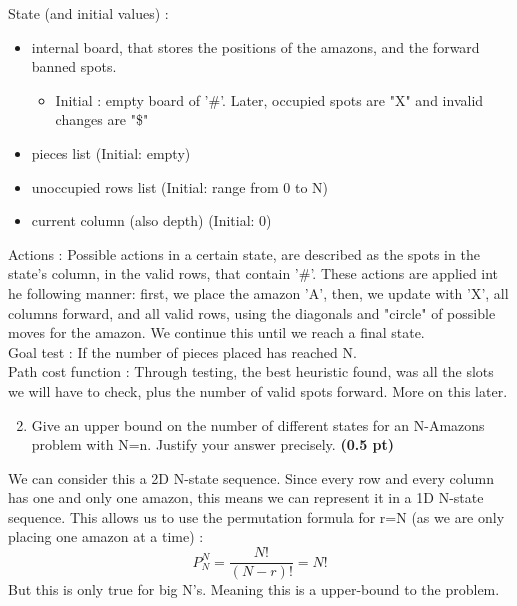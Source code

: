 \documentclass[11pt,a4paper]{report}
\begin{document}
\begin{answers}[8cm]
State (and initial values) :
\begin{itemize}
    \item internal board, that stores the positions of the amazons, and the forward banned spots.
    \begin{itemize}
        \item Initial : empty board of '\#'. Later, occupied spots are "X" and invalid changes are "\$"
    \end{itemize}
    \item pieces list (Initial: empty)
    \item unoccupied rows list (Initial: range from 0 to N)
    \item current column (also depth) (Initial: 0)
\end{itemize}
Actions : Possible actions in a certain state, are described as the spots in the state's column, in the valid rows, that contain '\#'. These actions are applied int he following manner: first, we place the amazon 'A', then, we update with 'X', all columns forward, and all valid rows, using the diagonals and "circle" of possible moves for the amazon. We continue this until we reach a final state.\\
Goal test : If the number of pieces placed has reached N.\\
Path cost function : Through testing, the best heuristic found, was all the slots we will have to check, plus the number of valid spots forward. More on this later.
\end{answers}


\newpage
\begin{enumerate}
\setcounter{enumi}{1}
\item Give an upper bound on the number of different states for an N-Amazons problem with N=n. Justify your answer precisely. \textbf{(0.5 pt)}
\end{enumerate}

\begin{answers}[5cm]
We can consider this a 2D N-state sequence. Since every row and every column has one and only one amazon, this means we can represent it in a 1D N-state sequence. This allows us to use the permutation formula for r=N (as we are only placing one amazon at a time) :
$$P^N_N = \frac{N!}{(N-r)!} = N!$$
But this is only true for big N's. Meaning this is a upper-bound to the problem.
\end{answers}
\end{document}
